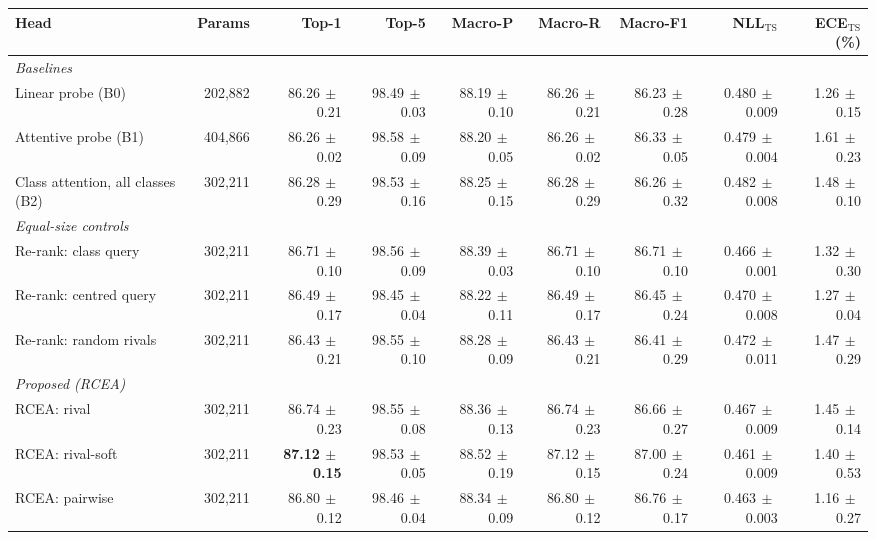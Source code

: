 \begin{tabular}{lrrrrrrrr}
\toprule
Head & Params & Top-1 & Top-5 & Macro-P & Macro-R & Macro-F1 & NLL$_{\mathrm{TS}}$ & ECE$_{\mathrm{TS}}$ (\%) \\
\midrule
\multicolumn{9}{l}{\emph{Baselines}} \\
Linear probe (B0) & 202,882 & 86.26{\scriptsize$\,\pm\,$0.21} & 98.49{\scriptsize$\,\pm\,$0.03} & 88.19{\scriptsize$\,\pm\,$0.10} & 86.26{\scriptsize$\,\pm\,$0.21} & 86.23{\scriptsize$\,\pm\,$0.28} & 0.480{\scriptsize$\,\pm\,$0.009} & 1.26{\scriptsize$\,\pm\,$0.15} \\
Attentive probe (B1) & 404,866 & 86.26{\scriptsize$\,\pm\,$0.02} & 98.58{\scriptsize$\,\pm\,$0.09} & 88.20{\scriptsize$\,\pm\,$0.05} & 86.26{\scriptsize$\,\pm\,$0.02} & 86.33{\scriptsize$\,\pm\,$0.05} & 0.479{\scriptsize$\,\pm\,$0.004} & 1.61{\scriptsize$\,\pm\,$0.23} \\
Class attention, all classes (B2) & 302,211 & 86.28{\scriptsize$\,\pm\,$0.29} & 98.53{\scriptsize$\,\pm\,$0.16} & 88.25{\scriptsize$\,\pm\,$0.15} & 86.28{\scriptsize$\,\pm\,$0.29} & 86.26{\scriptsize$\,\pm\,$0.32} & 0.482{\scriptsize$\,\pm\,$0.008} & 1.48{\scriptsize$\,\pm\,$0.10} \\
\multicolumn{9}{l}{\emph{Equal-size controls}} \\
Re-rank: class query & 302,211 & 86.71{\scriptsize$\,\pm\,$0.10} & 98.56{\scriptsize$\,\pm\,$0.09} & 88.39{\scriptsize$\,\pm\,$0.03} & 86.71{\scriptsize$\,\pm\,$0.10} & 86.71{\scriptsize$\,\pm\,$0.10} & 0.466{\scriptsize$\,\pm\,$0.001} & 1.32{\scriptsize$\,\pm\,$0.30} \\
Re-rank: centred query & 302,211 & 86.49{\scriptsize$\,\pm\,$0.17} & 98.45{\scriptsize$\,\pm\,$0.04} & 88.22{\scriptsize$\,\pm\,$0.11} & 86.49{\scriptsize$\,\pm\,$0.17} & 86.45{\scriptsize$\,\pm\,$0.24} & 0.470{\scriptsize$\,\pm\,$0.008} & 1.27{\scriptsize$\,\pm\,$0.04} \\
Re-rank: random rivals & 302,211 & 86.43{\scriptsize$\,\pm\,$0.21} & 98.55{\scriptsize$\,\pm\,$0.10} & 88.28{\scriptsize$\,\pm\,$0.09} & 86.43{\scriptsize$\,\pm\,$0.21} & 86.41{\scriptsize$\,\pm\,$0.29} & 0.472{\scriptsize$\,\pm\,$0.011} & 1.47{\scriptsize$\,\pm\,$0.29} \\
\multicolumn{9}{l}{\emph{Proposed (RCEA)}} \\
RCEA: rival & 302,211 & 86.74{\scriptsize$\,\pm\,$0.23} & 98.55{\scriptsize$\,\pm\,$0.08} & 88.36{\scriptsize$\,\pm\,$0.13} & 86.74{\scriptsize$\,\pm\,$0.23} & 86.66{\scriptsize$\,\pm\,$0.27} & 0.467{\scriptsize$\,\pm\,$0.009} & 1.45{\scriptsize$\,\pm\,$0.14} \\
RCEA: rival-soft & 302,211 & \textbf{87.12{\scriptsize$\,\pm\,$0.15}} & 98.53{\scriptsize$\,\pm\,$0.05} & 88.52{\scriptsize$\,\pm\,$0.19} & 87.12{\scriptsize$\,\pm\,$0.15} & 87.00{\scriptsize$\,\pm\,$0.24} & 0.461{\scriptsize$\,\pm\,$0.009} & 1.40{\scriptsize$\,\pm\,$0.53} \\
RCEA: pairwise & 302,211 & 86.80{\scriptsize$\,\pm\,$0.12} & 98.46{\scriptsize$\,\pm\,$0.04} & 88.34{\scriptsize$\,\pm\,$0.09} & 86.80{\scriptsize$\,\pm\,$0.12} & 86.76{\scriptsize$\,\pm\,$0.17} & 0.463{\scriptsize$\,\pm\,$0.003} & 1.16{\scriptsize$\,\pm\,$0.27} \\
\bottomrule
\end{tabular}
